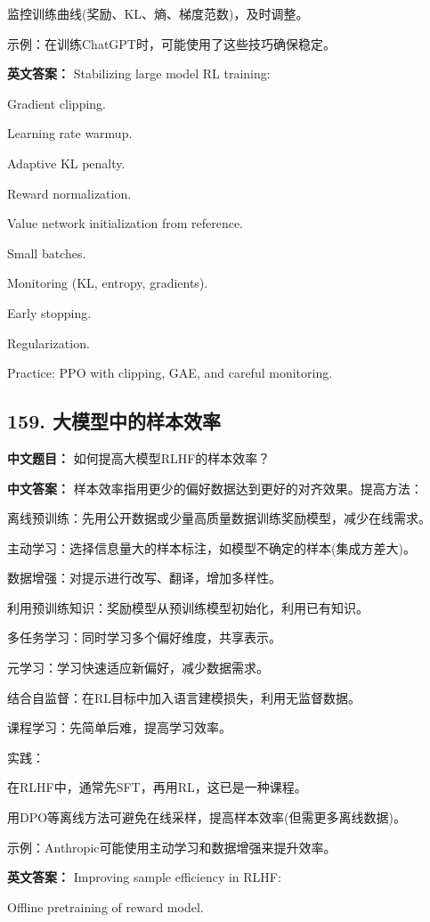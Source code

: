 \documentclass[10pt,a4paper]{ctexart}
\begin{document}
监控训练曲线(奖励、KL、熵、梯度范数)，及时调整。

示例：在训练ChatGPT时，可能使用了这些技巧确保稳定。

\textbf{英文答案：}
Stabilizing large model RL training:

Gradient clipping.

Learning rate warmup.

Adaptive KL penalty.

Reward normalization.

Value network initialization from reference.

Small batches.

Monitoring (KL, entropy, gradients).

Early stopping.

Regularization.

Practice: PPO with clipping, GAE, and careful monitoring.

\subsection*{159. 大模型中的样本效率}
\textbf{中文题目：} 如何提高大模型RLHF的样本效率？

\textbf{中文答案：}
样本效率指用更少的偏好数据达到更好的对齐效果。提高方法：

离线预训练：先用公开数据或少量高质量数据训练奖励模型，减少在线需求。

主动学习：选择信息量大的样本标注，如模型不确定的样本(集成方差大)。

数据增强：对提示进行改写、翻译，增加多样性。

利用预训练知识：奖励模型从预训练模型初始化，利用已有知识。

多任务学习：同时学习多个偏好维度，共享表示。

元学习：学习快速适应新偏好，减少数据需求。

结合自监督：在RL目标中加入语言建模损失，利用无监督数据。

课程学习：先简单后难，提高学习效率。

实践：

在RLHF中，通常先SFT，再用RL，这已是一种课程。

用DPO等离线方法可避免在线采样，提高样本效率(但需更多离线数据)。

示例：Anthropic可能使用主动学习和数据增强来提升效率。

\textbf{英文答案：}
Improving sample efficiency in RLHF:

Offline pretraining of reward model.
\end{document}
